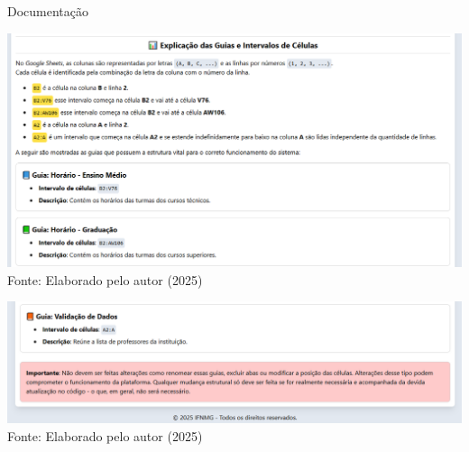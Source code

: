 \begin{frame}{Documentação}
    \begin{minipage}{0.48\textwidth}
        \centering
        \includegraphics[width=1\textwidth]{figuras/doc-3.png}
        \small Fonte: Elaborado pelo autor (2025)
    \end{minipage}
    \hfill
    \begin{minipage}{0.48\textwidth}
        \centering
        \includegraphics[width=1\textwidth]{figuras/doc-4.png}
        \small Fonte: Elaborado pelo autor (2025)
    \end{minipage}
\end{frame}